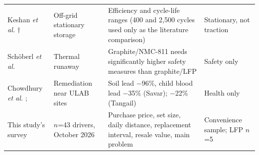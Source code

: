 \begin{table}[t]
\begin{tabular}{p{2.6cm}p{3.0cm}p{6.0cm}p{2.8cm}}
Keshan \emph{et al.} \cite{keshan2016}$\dagger$ & Off-grid stationary storage & Efficiency and cycle-life ranges (400 and 2{,}500 cycles used only as the literature comparison) & Stationary, not traction \\
Sch\"oberl \emph{et al.} \cite{schoberl2024} & Thermal runaway & Graphite/NMC-811 needs significantly higher safety measures than graphite/LFP & Safety only \\
Chowdhury \emph{et al.} \cite{chowdhury2021}; \cite{eos2026} & Remediation near ULAB sites & Soil lead $-$96\%, child blood lead $-$35\% (Savar); $-$22\% (Tangail) & Health only \\
This study's survey \cite{survey2026} & $n$=43 drivers, October 2026 & Purchase price, set size, daily distance, replacement interval, resale value, main problem & Convenience sample; LFP $n$=5 \\
\hline
\end{tabular}
\end{table}

